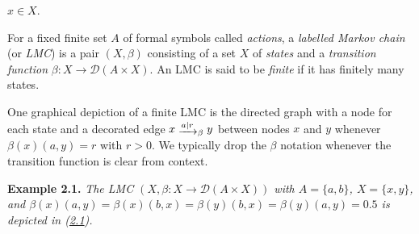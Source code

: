 \hypertarget{html:S2.SS0.SSS0.P0.SPx1.p1.m15}{}\({x\in X}\).
\par\medskip
\hypertarget{html:S2.SS0.SSS0.P0.SPx1.p2}{} For a fixed finite set %
\hypertarget{html:S2.SS0.SSS0.P0.SPx1.p2.m1}{}\({A}\) of formal symbols called \emph{actions}, a \emph{labelled Markov chain} (or \emph{LMC}) is a pair %
\hypertarget{html:S2.SS0.SSS0.P0.SPx1.p2.m2}{}\({(X,\beta)}\) consisting of a set %
\hypertarget{html:S2.SS0.SSS0.P0.SPx1.p2.m3}{}\({X}\) of \emph{states} and a \emph{transition function} %
\hypertarget{html:S2.SS0.SSS0.P0.SPx1.p2.m4}{}\({\beta\colon X\to{\mathcal{D}}(A\times X)}\). An LMC is said to be \emph{finite} if it has finitely many states.
\par\medskip
\hypertarget{html:S2.SS0.SSS0.P0.SPx1.p3}{} One graphical depiction of a finite LMC is the directed graph with a node for each state and a decorated edge %
\hypertarget{html:S2.SS0.SSS0.P0.SPx1.p3.m1}{}\({x\mathrel{\raisebox{-2.0pt}{$\xrightarrow{a\mid r}$}}_{\beta}y}\) between nodes %
\hypertarget{html:S2.SS0.SSS0.P0.SPx1.p3.m2}{}\({x}\) and %
\hypertarget{html:S2.SS0.SSS0.P0.SPx1.p3.m3}{}\({y}\) whenever %
\hypertarget{html:S2.SS0.SSS0.P0.SPx1.p3.m4}{}\({\beta(x)(a,y)=r}\) with %
\hypertarget{html:S2.SS0.SSS0.P0.SPx1.p3.m5}{}\({r>0}\). We typically drop the %
\hypertarget{html:S2.SS0.SSS0.P0.SPx1.p3.m6}{}\({\beta}\) notation whenever the transition function is clear from context.
\par\medskip
\hypertarget{html:S2.Thmtheorem1}{} \par\noindent\textbf{\textbf{Example 2.1}\textbf{.}}\quad  %
\hypertarget{html:S2.Thmtheorem1.p1}{} \emph{The LMC %
\hypertarget{html:S2.Thmtheorem1.p1.m1}{}\({(X,\beta\colon X\to{\mathcal{D}}(A\times X))}\) with %
\hypertarget{html:S2.Thmtheorem1.p1.m2}{}\({A=\{a,b\}}\), %
\hypertarget{html:S2.Thmtheorem1.p1.m3}{}\({X=\{x,y\}}\), and %
\hypertarget{html:S2.Thmtheorem1.p1.m4}{}\({\beta(x)(a,y)=\beta(x)(b,x)=\beta(y)(b,x)=\beta(y)(a,y)=0.5}\) is depicted in (\hyperlink{html:S2.E1}{2.1}).}
